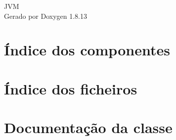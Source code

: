 \documentclass[twoside]{book}
\newcommand{\+}{\discretionary{\mbox{\scriptsize$\hookleftarrow$}}{}{}}
\newcommand{\clearemptydoublepage}{%
  \newpage{\pagestyle{empty}\cleardoublepage}%
}
\begin{document}
\hypersetup{pageanchor=false,
             bookmarksnumbered=true,
             pdfencoding=unicode
            }
\begin{titlepage}
\vspace*{7cm}
\begin{center}%
{\Large J\+VM }\\
\vspace*{1cm}
{\large Gerado por Doxygen 1.8.13}\\
\end{center}
\end{titlepage}
\clearemptydoublepage
{}
\tableofcontents
\clearemptydoublepage
{}
\hypersetup{pageanchor=true}

\chapter{Índice dos componentes}

\chapter{Índice dos ficheiros}

\chapter{Documentação da classe}





















































\end{document}
